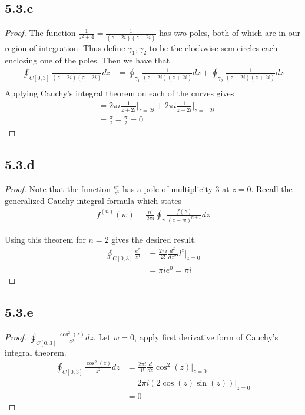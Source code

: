 \documentclass[a4paper, 11pt]{article}
\begin{document}
	
\subsection*{5.3.c}
	\begin{proof}
		The function $\frac{1}{z^2+4}=\frac{1}{(z-2i)(z+2i)}$ has two poles, both of which are in our region of integration. Thus define $\gamma_1, \gamma_2$ to be the clockwise semicircles each enclosing one of the poles. Then we have that
			\begin{align*}
				\oint_{C[0,3]}\frac{1}{(z-2i)(z+2i)}dz &= \oint_{\gamma_1}\frac{1}{(z-2i)(z+2i)}dz+\oint_{\gamma_2}\frac{1}{(z-2i)(z+2i)}dz\\ 
			\end{align*}
		\noindent Applying Cauchy's integral theorem on each of the curves gives 
			\begin{align*}
				&= 2\pi i \frac{1}{z+2i}\big|_{z=2i}+ 2\pi i \frac{1}{z-2i}\big|_{z=-2i} \\ 
				&= \frac{\pi}{2} - \frac{\pi}{2} = 0
			\end{align*}
	\end{proof}
	
	
\subsection*{5.3.d} 
	\begin{proof}
	Note that the function $\frac{e^{z}}{z^3}$ has a pole of multiplicity 3 at $z=0$. Recall the generalized Cauchy integral formula which states
		\begin{align*}
			f^{(n)}(w) = \frac{n!}{2\pi i}\oint_\gamma \frac{f(z)}{(z-w)^{n+1}}dz
		\end{align*}
		
	\noindent Using this theorem for $n=2$ gives the desired result. 
		\begin{align*}
			\oint_{C[0,3]}\frac{e^z}{z^3} &= \frac{2\pi i}{2!}\frac{d^2}{dz^2}d^z\big|_{z=0} \\ 
				&= \pi i e^0 = \pi i 
		\end{align*}
	\end{proof}

\subsection*{5.3.e}
	\begin{proof}
		$\oint_{C[0,3]}\frac{\cos^2(z)}{z^2}dz$. Let $w=0$, apply first derivative form of Cauchy's integral theorem. 
			\begin{align*}
				\oint_{C[0,3]}\frac{\cos^2(z)}{z^2}dz &= \frac{2\pi i}{1!}\frac{d}{dz}\cos^2(z)\big|_{z=0} \\ 
				&= 2\pi i (2\cos(z)\sin(z))\big|_{z=0} \\ 
				&= 0 
			\end{align*}
	\end{proof}	
	
\end{document}
